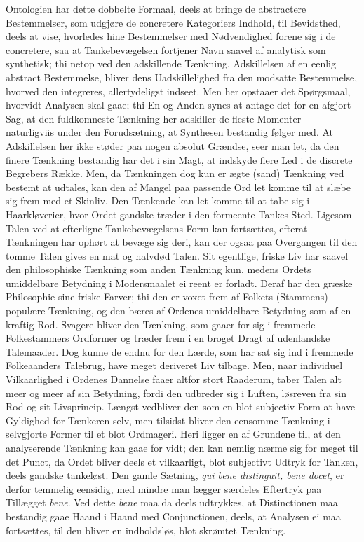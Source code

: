 \documentclass[12pt]{article}
\newcommand{\opage}[1]{\marginnote{\footnotesize\textit{[#1]}}}
\begin{document}
Ontologien har dette dobbelte Formaal, deels at bringe de abstractere
Bestemmelser, som udgjøre de concretere Kategoriers Indhold, til Bevidsthed,
deels at vise, hvorledes hine Bestemmelser med Nødvendighed forene sig i de
concretere, saa at Tankebevægelsen fortjener Navn saavel af analytisk som
synthetisk; thi netop ved den adskillende Tænkning, Adskillelsen af en eenlig
abstract Bestemmelse, bliver dens Uadskillelighed fra den modsatte Bestemmelse,
hvorved den integreres, allertydeligst indseet. Men her opstaaer det Spørgsmaal,
hvorvidt Analysen skal gaae; thi En og Anden synes at antage det for en afgjort
Sag, at den fuldkomneste Tænkning her adskiller de fleste Momenter ---
naturligviis under den Forudsætning, at Synthesen bestandig følger med. At
Adskillelsen her ikke støder paa nogen absolut Grændse, seer man let, da den
finere Tænkning bestandig har det i sin Magt, at indskyde flere Led i de discrete
Begrebers Række. Men, da Tænkningen dog kun er ægte (sand) Tænkning ved bestemt
at udtales, kan den af Mangel paa passende Ord let komme til at slæbe sig frem
med et Skinliv. Den Tænkende kan let komme til at tabe sig i Haarkløverier, hvor
Ordet gandske træder i den \opage{204}formeente Tankes Sted. Ligesom Talen ved
at efterligne Tankebevægelsens Form kan fortsættes, efterat Tænkningen har
ophørt at bevæge sig deri, kan der ogsaa paa Overgangen til den tomme Talen
gives en mat og halvdød Talen. Sit egentlige, friske Liv har saavel den
philosophiske Tænkning som anden Tænkning kun, medens Ordets umiddelbare
Betydning i Modersmaalet ei reent er forladt. Deraf har den græske Philosophie
sine friske Farver; thi den er voxet frem af Folkets (Stammens) populære
Tænkning, og den bæres af Ordenes umiddelbare Betydning som af en kraftig Rod.
Svagere bliver den Tænkning, som gaaer for sig i fremmede Folkestammers Ordformer
og træder frem i en broget Dragt af udenlandske Talemaader. Dog kunne de endnu
for den Lærde, som har sat sig ind i fremmede Folkeaanders Talebrug, have meget
deriveret Liv tilbage. Men, naar individuel Vilkaarlighed i Ordenes Dannelse
faaer altfor stort Raaderum, taber Talen alt meer og meer af sin Betydning, fordi
den udbreder sig i Luften, løsreven fra sin Rod og sit Livsprincip. Længst
vedbliver den som en blot subjectiv Form at have Gyldighed for Tænkeren selv, men
tilsidst bliver den eensomme Tænkning i selvgjorte Former til et blot Ordmageri.
Heri ligger en af Grundene til, at den analyserende Tænkning kan gaae for vidt;
den kan nemlig nærme sig for meget til det Punct, da Ordet bliver deels et
vilkaarligt, blot subjectivt Udtryk for Tanken, deels gandske tankeløst. Den
gamle Sætning, \textit{qui bene distinguit, bene docet}, er derfor temmelig
eensidig, med mindre man lægger særdeles Eftertryk paa Tillægget \textit{bene}.
Ved dette \textit{bene} maa da deels udtrykkes, at Distinctionen maa bestandig
gaae Haand i Haand med Conjunctionen, deels, at Analysen ei maa fortsættes, til
den bliver en indholdsløs, blot skrømtet Tænkning.
\end{document}
